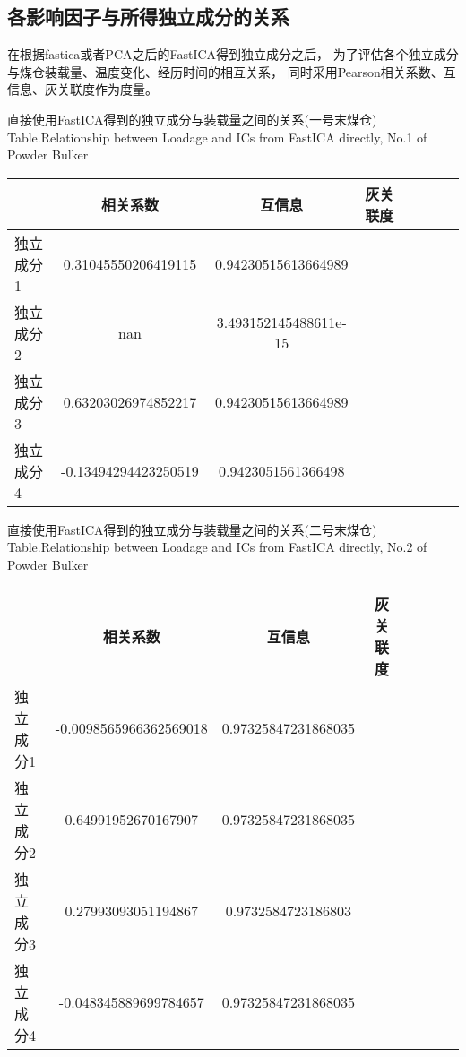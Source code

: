 \subsection{各影响因子与所得独立成分的关系}
在根据fastica或者PCA之后的FastICA得到独立成分之后，
为了评估各个独立成分与煤仓装载量、温度变化、经历时间的相互关系，
同时采用Pearson相关系数、互信息、灰关联度作为度量。

\begin{table}[!h]
\begin{center}
			{直接使用FastICA得到的独立成分与装载量之间的关系(一号末煤仓)}
			{Table.}{Relationship between Loadage and ICs from FastICA directly, No.1 of Powder Bulker}
\begin{tabular}{lccclccc}
\toprule
                		& 相关系数     				& 互信息      					&灰关联度 \\
\midrule
  独立成分1     	&  0.31045550206419115       	& 0.94230515613664989   	&    \\
  独立成分2     	&  nan          					& 3.493152145488611e-15   	&    \\
  独立成分3     	&  0.63203026974852217      	& 0.94230515613664989		&    \\
  独立成分4     	&  -0.13494294423250519    	& 0.9423051561366498		&    \\
 \bottomrule
\end{tabular}
\end{center}
\end{table}

\begin{table}[!h]
\begin{center}
			{直接使用FastICA得到的独立成分与装载量之间的关系(二号末煤仓)}
			{Table.}{Relationship between Loadage and ICs from FastICA directly, No.2 of Powder Bulker}
\begin{tabular}{lccclccc}
\toprule
                		& 相关系数     				& 互信息      					&灰关联度 \\
\midrule
  独立成分1     	&  -0.0098565966362569018  	& 0.97325847231868035   	&    \\
  独立成分2     	&  0.64991952670167907		& 0.97325847231868035   	&    \\
  独立成分3     	&  0.27993093051194867      	& 0.9732584723186803		&    \\
  独立成分4     	&  -0.048345889699784657    	& 0.97325847231868035		&    \\
 \bottomrule
\end{tabular}
\end{center}
\end{table}

